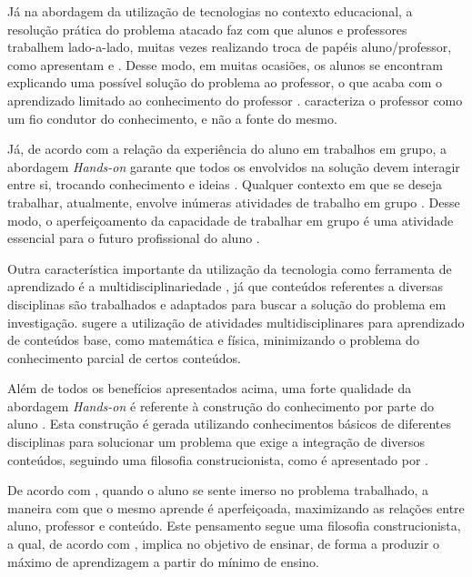 Já na abordagem da utilização de tecnologias no contexto educacional, a resolução prática do problema atacado faz com que alunos e professores trabalhem lado-a-lado, muitas vezes realizando troca de papéis aluno/professor, como apresentam \cite{construcionismoPapert} e \cite{daMaquinaDeEnsinarAMaquinaDeAprender}. Desse modo, em muitas ocasiões, os alunos se encontram explicando uma possível solução do problema ao professor, o que acaba com o aprendizado limitado ao conhecimento do professor \cite{PCsEConstrucionismo}. \cite{construcionismoPapert} caracteriza o professor como um fio condutor do conhecimento, e não a fonte do mesmo.

Já, de acordo com a relação da experiência do aluno em trabalhos em grupo, a abordagem \textit{Hands-on} garante que todos os envolvidos na solução devem interagir entre si, trocando conhecimento e ideias \cite{teachingWithRoboticKit}. Qualquer contexto em que se deseja trabalhar, atualmente, envolve inúmeras atividades de trabalho em grupo \cite{teachingWithRoboticKit}. Desse modo, o aperfeiçoamento da capacidade de trabalhar em grupo é uma atividade essencial para o futuro profissional do aluno \cite{PCsEConstrucionismo}.

Outra característica importante da utilização da tecnologia como ferramenta de aprendizado é a multidisciplinariedade \cite{analiseFerramentaEnsinoComputacao}, já que conteúdos referentes a diversas disciplinas são trabalhados e adaptados para buscar a solução do problema em investigação. \cite{teachingWithRoboticKit} sugere a utilização de atividades multidisciplinares para aprendizado de conteúdos base, como matemática e física, minimizando o problema do conhecimento parcial de certos conteúdos.

Além de todos os benefícios apresentados acima, uma forte qualidade da abordagem \textit{Hands-on} é referente à construção do conhecimento por parte do aluno \cite{PCsEConstrucionismo}. Esta construção é gerada utilizando conhecimentos básicos de diferentes disciplinas para solucionar um problema que exige a integração de diversos conteúdos, seguindo uma filosofia construcionista, como é apresentado por \cite{construcionismoPapert}.


	De acordo com \cite{construcionismoPapert}, quando o aluno se sente imerso no problema trabalhado, a maneira com que o mesmo aprende é aperfeiçoada, maximizando as relações entre aluno, professor e conteúdo. Este pensamento segue uma filosofia construcionista, a qual, de acordo com \cite{construcionismoPapert}, implica no objetivo de ensinar, de forma a produzir o máximo de aprendizagem a partir do mínimo de ensino.

